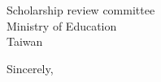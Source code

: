 \documentclass[12pt, a4paper]{simref} %
\begin{document}
\begin{letter}{
	Scholarship review committee\\
	Ministry of Education\\
	Taiwan\\
}

\closing{Sincerely,}




\end{letter}
\end{document}
